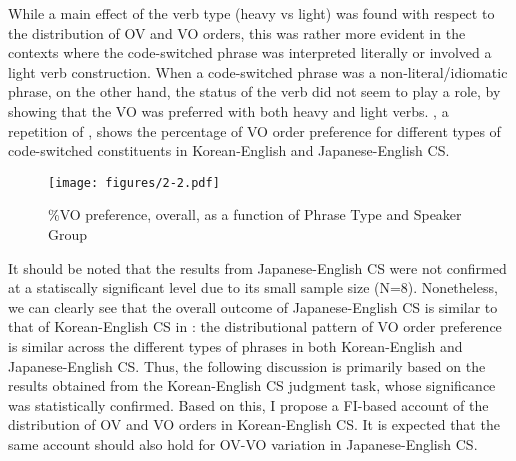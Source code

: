 While a main effect of the verb type (heavy vs light) was found with respect to the distribution of \ac{OV} and \ac{VO} orders, this was rather more evident in the contexts where the code-switched phrase was interpreted literally or involved a light verb construction. When a code-switched phrase was a non-literal/idiomatic phrase, on the other hand, the status of the verb did not seem to play a role, by showing that the \ac{VO} was preferred with both heavy and light verbs. , a repetition of , shows the percentage of \ac{VO} order preference for different types of code-switched constituents in Korean-English and Japanese-English \ac{CS}. 

\begin{figure}
\texttt{[image: figures/2-2.pdf]}
\caption{\%\ac{VO} preference, overall, as a function of Phrase Type and Speaker Group} 
\label{fig:2.2again}
\end{figure}

\largerpage
It should be noted that the results from Japanese-English \ac{CS} were not confirmed at a statiscally significant level due to its small sample size (N=8). Nonetheless, we can clearly see that the overall outcome of Japanese-English \ac{CS} is similar to that of Korean-English \ac{CS} in : the distributional pattern of \ac{VO} order preference is similar across the different types of phrases in both Korean-English and Japanese-English \ac{CS}. Thus, the following discussion is primarily based on the results obtained from the Korean-English \ac{CS} judgment task, whose significance was statistically confirmed. Based on this, I propose a \ac{FI}-based account of the distribution of \ac{OV} and \ac{VO} orders in Korean-English \ac{CS}. It is expected that the same account should also hold for \ac{OV}-\ac{VO} variation in Japanese-English \ac{CS}.

